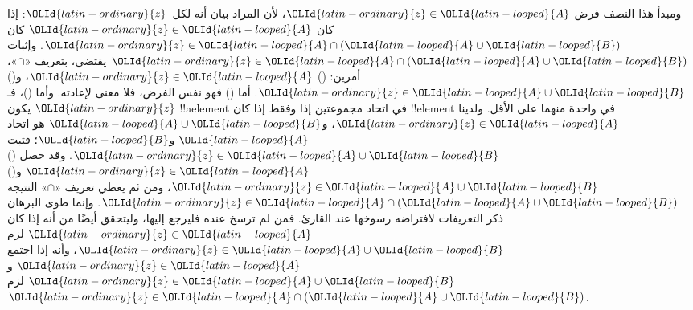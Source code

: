 \documentclass[../../../include/open-logic-section]{subfiles}
\begin{document}
ومبدأ هذا النصف فرض $\OLId{latin-ordinary}{z} \in \OLId{latin-looped}{A}$، لأن المراد بيان أنه لكل~$\OLId{latin-ordinary}{z}$: إذا كان
$\OLId{latin-ordinary}{z} \in \OLId{latin-looped}{A}$ كان $\OLId{latin-ordinary}{z} \in \OLId{latin-looped}{A} \cap (\OLId{latin-looped}{A} \cup \OLId{latin-looped}{B})$. وإثبات
$\OLId{latin-ordinary}{z} \in \OLId{latin-looped}{A} \cap (\OLId{latin-looped}{A} \cup \OLId{latin-looped}{B})$ يقتضي، بتعريف «$\cap$»، أمرين: ()
$\OLId{latin-ordinary}{z} \in \OLId{latin-looped}{A}$، و() $\OLId{latin-ordinary}{z} \in \OLId{latin-looped}{A} \cup \OLId{latin-looped}{B}$. أما () فهو نفس الفرض، فلا معنى
لإعادته. وأما ()، فـ$\OLId{latin-ordinary}{z}$ يكون !!a{element} في اتحاد مجموعتين إذا
وفقط إذا كان !!{element} في واحدة منهما على الأقل. ولدينا
$\OLId{latin-ordinary}{z} \in \OLId{latin-looped}{A}$، و$\OLId{latin-looped}{A} \cup \OLId{latin-looped}{B}$ هو اتحاد $\OLId{latin-looped}{A}$ و$\OLId{latin-looped}{B}$؛ فثبت
$\OLId{latin-ordinary}{z} \in \OLId{latin-looped}{A} \cup \OLId{latin-looped}{B}$. وقد حصل () $\OLId{latin-ordinary}{z} \in \OLId{latin-looped}{A}$ و()
$\OLId{latin-ordinary}{z} \in \OLId{latin-looped}{A} \cup \OLId{latin-looped}{B}$، ومن ثم يعطي تعريف «$\cap$» النتيجة
$\OLId{latin-ordinary}{z} \in \OLId{latin-looped}{A} \cap (\OLId{latin-looped}{A} \cup \OLId{latin-looped}{B})$. وإنما طوى البرهان ذكر التعريفات لافتراضه
رسوخها عند القارئ. فمن لم ترسخ عنده فليرجع إليها، وليتحقق أيضًا من
أنه إذا كان $\OLId{latin-ordinary}{z} \in \OLId{latin-looped}{A}$ لزم $\OLId{latin-ordinary}{z} \in \OLId{latin-looped}{A} \cup \OLId{latin-looped}{B}$، وأنه إذا اجتمع
$\OLId{latin-ordinary}{z} \in \OLId{latin-looped}{A}$ و$\OLId{latin-ordinary}{z} \in \OLId{latin-looped}{A} \cup \OLId{latin-looped}{B}$ لزم $\OLId{latin-ordinary}{z} \in \OLId{latin-looped}{A} \cap (\OLId{latin-looped}{A} \cup \OLId{latin-looped}{B})$.
\end{document}
